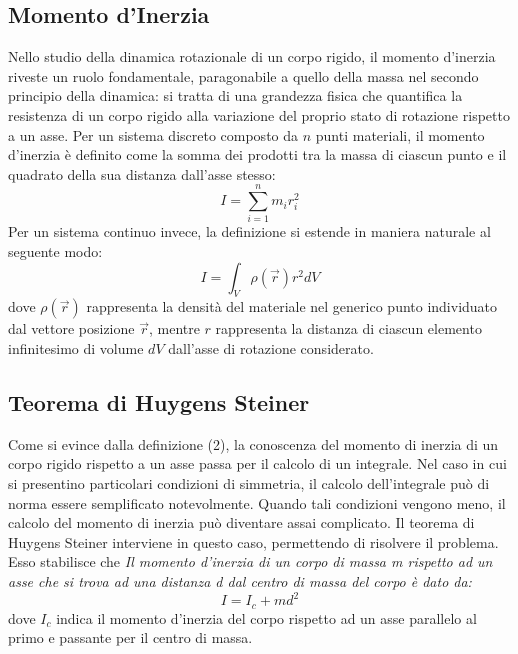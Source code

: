 \subsection{Momento d'Inerzia}
Nello studio della dinamica rotazionale di un corpo rigido, il momento d'inerzia riveste un ruolo fondamentale, paragonabile a quello della massa nel secondo principio della dinamica: si tratta di una grandezza fisica che quantifica la resistenza di un corpo rigido alla variazione del proprio stato di rotazione rispetto a un asse. Per un sistema discreto composto da $n$ punti materiali, il momento d'inerzia è definito come la somma dei prodotti tra la massa di ciascun punto e il quadrato della sua distanza dall'asse stesso:
\begin{equation}
    I = \sum_{i=1}^{n}m_ir_i^2
\end{equation}
Per un sistema continuo invece, la definizione si estende in maniera naturale al seguente modo:
\begin{equation}
    I = \int_{V}\rho(\vec{r})r^2dV
\end{equation}
dove $\rho(\vec{r})$ rappresenta la densità del materiale nel generico punto individuato dal vettore posizione $\vec{r}$, mentre $r$ rappresenta la distanza di ciascun elemento infinitesimo di volume 
$dV$ dall'asse di rotazione considerato.

\subsection{Teorema di Huygens Steiner}
Come si evince dalla definizione (2), la conoscenza del momento di inerzia di un corpo rigido rispetto a un asse passa per il calcolo di un integrale. Nel caso in cui si presentino particolari condizioni di simmetria, il calcolo dell'integrale può di norma essere semplificato notevolmente. Quando tali condizioni vengono meno, il calcolo del momento di inerzia può diventare assai complicato. Il teorema di Huygens Steiner interviene in questo caso, permettendo di risolvere il problema. Esso stabilisce che \emph{Il momento d'inerzia di un corpo di massa m rispetto ad un asse che si trova ad una distanza d  dal centro di massa del corpo è dato da:}
\begin{equation}
    I = I_c + md^2
\end{equation}
dove $I_c$ indica il momento d'inerzia del corpo rispetto ad un asse parallelo al primo e passante per il centro di massa. 

